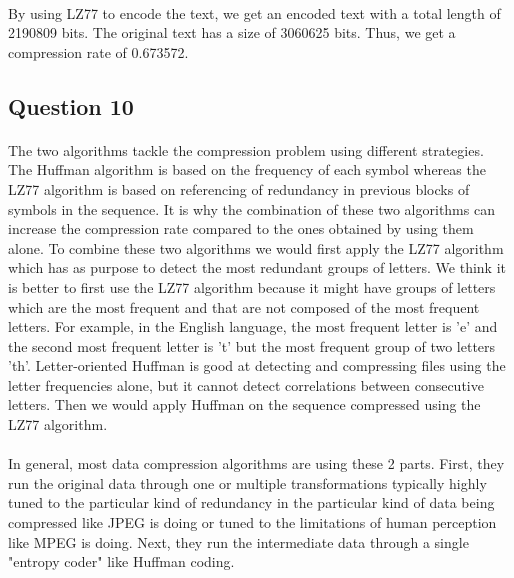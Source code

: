 \documentclass[a4paper, 11pt, oneside]{article}
\begin{document}
\paragraph{}By using LZ77 to encode the text, we get an encoded text with a total length of 2190809 bits.
The original text has a size of 3060625 bits. Thus, we get a compression rate of 0.673572.


\subsection{Question 10}
\paragraph{}The two algorithms tackle the compression problem using different strategies. The Huffman 
algorithm is based on the frequency of each symbol whereas the LZ77 algorithm is based on referencing of 
redundancy in previous blocks of symbols in the sequence. It is why the combination of these two algorithms can increase the compression rate compared to the ones obtained by using them alone.
To combine these two algorithms we would first apply the LZ77 algorithm which has as purpose to detect the most redundant groups of letters. We think it is better to first
use the LZ77 algorithm because it might have groups of letters which are the most frequent and that are not composed of the most frequent letters. For example, in the English language, the 
most frequent letter is 'e' and the second most frequent letter is 't' but the most frequent group of two letters 'th'. Letter-oriented Huffman is good at detecting and compressing files using the letter frequencies alone, but it cannot detect correlations between consecutive letters.
Then we would apply Huffman on the sequence compressed using the LZ77 algorithm. 

\paragraph{}In general, most data compression algorithms are using these 2 parts. First, they run the original data through one or multiple transformations typically highly tuned to the particular kind of redundancy in the particular kind of data being compressed like JPEG is doing or tuned to the limitations of human perception like MPEG is doing. Next, they run the intermediate data through a single "entropy coder" like Huffman coding.
\end{document}
